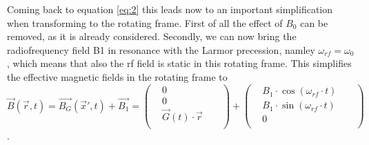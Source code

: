 \documentclass[a4paper,12pt]{extarticle}
\begin{document}
Coming back to equation \eqref{eq:2} this leads now to an important simplification when transforming to the rotating frame. First of all the effect of $B_0$ can be removed, as it is already considered. Secondly, we can now bring the radiofrequency field B1 in resonance with the Larmor precession, namley $\omega_{rf} = \omega_0$, which means that also the rf field is static in this rotating frame. This simplifies the effective magnetic fields in the rotating frame to
 \begin{equation} 
 \label{eq:B_BG_B1}
 \vec{B}(\vec{r},t)  =  \vec{B_G}(\vec{x}',t) + \vec{B_1} = 
  \begin{pmatrix}
  & 0 \\
& 0 \\
& \vec{G}(t)\cdot\vec{r} &  & \\
\end{pmatrix}
+
 \begin{pmatrix}
  & B_1\cdot \cos(\omega_{rf}\cdot t) \\
& B_1\cdot \sin(\omega_{rf}\cdot t) \\
& 0 &  & \\
\end{pmatrix}
 \end{equation}.
 
\end{document}
